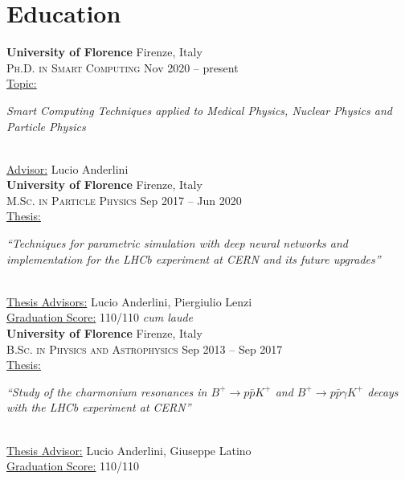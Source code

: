\newcommand{\university}[2]
  {\large \textbf{\color{hlcolor-0} #1} \hfill {\color{hlcolor-2} #2}}
  
\newcommand{\degree}[2]
  {\small \color{hlcolor-1} \textsc{#1} \hfill {#2}}
  
\newcommand{\worktitle}[2]
  {\normalsize \color{maincolor}
    \ul{#1:}
    \begin{minipage}[t]{0.75\linewidth}
      \begin{flushleft}
        \emph{#2}
      \end{flushleft}
    \end{minipage}
  }


\section*{Education}
\begin{cvcontent}
  \university{University of Florence}{Firenze, Italy}\\
  \degree{Ph.D. in Smart Computing}{Nov 2020 -- present}\\ [1mm]
  \worktitle{Topic}{Smart Computing Techniques applied to Medical
  Physics, Nuclear Physics and Particle Physics}\\ [1.5mm]
  \ul{Advisor:} Lucio Anderlini
  \\ [0.5cm]
  \university{University of Florence}{Firenze, Italy}\\
  \degree{M.Sc. in Particle Physics}{Sep 2017 -- Jun 2020}\\ [1mm]
  \worktitle{Thesis}{``Techniques for parametric simulation with deep neural networks and implementation for the LHCb experiment at CERN
  and its future upgrades''}\\ [1.5mm]
  \ul{Thesis Advisors:} Lucio Anderlini, Piergiulio Lenzi\\ [0.5mm]
  \ul{Graduation Score:} 110/110 \emph{cum laude}
  \\ [0.5cm]
  \university{University of Florence}{Firenze, Italy}\\
  \degree{B.Sc. in Physics and Astrophysics}{Sep 2013 -- Sep 2017}\\ [1mm]
  \worktitle{Thesis}{``Study of the charmonium resonances in 
      $B^+ \to p \bar{p} K^+$ and $B^+ \to p \bar{p} \gamma K^+$
      decays with the LHCb experiment at CERN''}\\ [1.5mm]
  \ul{Thesis Advisor:} Lucio Anderlini, Giuseppe Latino\\ [0.5mm]
  \ul{Graduation Score:} 110/110
\end{cvcontent}